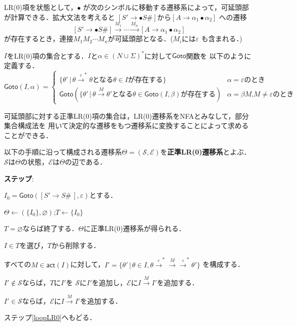 \documentclass[dvipdfmx,a4j]{jbook}
\newcounter{coffee}
\begin{document}
LR(0)項を状態として，$\bullet$
が次のシンボルに移動する遷移系によって，可延頭部が計算できる．拡大文法を考えると
$[S'\rightarrow\bullet S\texttt{\#}]$から$[A\rightarrow\alpha_1\bullet\alpha_2]$
への遷移
\[[S'\rightarrow\bullet S\texttt{\#}]\xrightarrow{M_1}\cdots\xrightarrow{M_n}
[A\rightarrow\alpha_1\bullet\alpha_2]\]
が存在するとき，連接$M_1M_2\cdots M_n$が可延頭部となる．($M_i$には$\varepsilon$
も含まれる．)

\begin{Def}
  $I$をLR(0)項の集合とする．$I$と$\alpha\in(N\cup\Sigma)^\ast$に対して$\mathsf{Goto}$関数を
  以下のように定義する．
  \[
    \mathsf{Goto}(I,\alpha)=\begin{cases}
      \{\theta'\,|\,\theta\xrightarrow{\varepsilon}^\ast\theta\mbox{となる$\theta\in I$が存在する}\} 
      & \mbox{$\alpha=\varepsilon$のとき}\\
      \mathsf{Goto}(\{\theta'\,|\,\theta\xrightarrow{M}\theta'\mbox{となる$\theta\in
      \mathsf{Goto}(I,\beta)$が存在する})
      & \mbox{$\alpha=\beta M$,$M\not=\varepsilon$のとき}
    \end{cases}\]
\end{Def}

可延頭部に対する正準LR(0)項の集合は，LR(0)遷移系をNFAとみなして，部分集合構成法を
用いて決定的な遷移をもつ遷移系に変換することによって求めることができる．

\begin{Alg}
  以下の手順に沿って構成される遷移系$\Theta=(\mathcal{S},\mathcal{E})$を{\bf 正準LR(0)遷移系}とよぶ．
  $\mathcal{S}$は$\Theta$の状態，$\mathcal{E}$は$\Theta$の辺である．
  \begin{list}{{\rm\bf ステップ}:}{}
    \item $I_0=\mathsf{Goto}([S'\rightarrow S\texttt{\#}\,],\varepsilon)$とする．
    \item $\Theta\leftarrow(\{I_0\},\varnothing)$;$T\leftarrow\{I_0\}$
    \item\label{loopLR0} $T=\varnothing$ならば終了する．$\Theta$に正準LR(0)遷移系が得られる．
    \item $I\in T$を選び，$T$から削除する．
    \item すべての$M\in\mathsf{act}(I)$に対して，$I'=\{\theta'\,|\,\theta\in I,\theta
    \xrightarrow{\varepsilon}^\ast\xrightarrow{M}\xrightarrow{\varepsilon}^\ast\theta'\}$
    を構成する．
    \begin{list}{}{}
      \item $I'\notin\mathcal{S}$ならば，$T$に$I'$を
        $\mathcal{S}$に$I'$を追加し，$\mathcal{E}$に$I\xrightarrow{M}I'$を追加する．
      \item $I'\in\mathcal{S}$ならば，$\mathcal{E}$に$I\xrightarrow{M}I'$を追加する．
    \end{list}
    \item ステップ\ref{loopLR0}へもどる．
  \end{list}  
\end{Alg}
\end{document}
